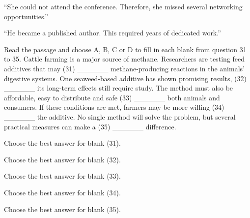 \begin{ex}
“She could not attend the conference. Therefore, she missed several networking opportunities.”
\end{ex}

\begin{ex}
“He became a published author. This required years of dedicated work.”
\end{ex}

\begin{baidoc}
\item[] Read the passage and choose A, B, C or D to fill in each blank from question 31 to 35.
Cattle farming is a major source of methane. Researchers are testing feed additives that may (31) ______ methane-producing reactions in the animals' digestive systems. One seaweed-based additive has shown promising results, (32) ______ its long-term effects still require study. The method must also be affordable, easy to distribute and safe (33) ______ both animals and consumers. If these conditions are met, farmers may be more willing (34) ______ the additive. No single method will solve the problem, but several practical measures can make a (35) ______ difference.

\begin{ex}
Choose the best answer for blank (31).
\end{ex}

\begin{ex}
Choose the best answer for blank (32).
\end{ex}

\begin{ex}
Choose the best answer for blank (33).
\end{ex}

\begin{ex}
Choose the best answer for blank (34).
\end{ex}

\begin{ex}
Choose the best answer for blank (35).
\end{ex}
\end{baidoc}

